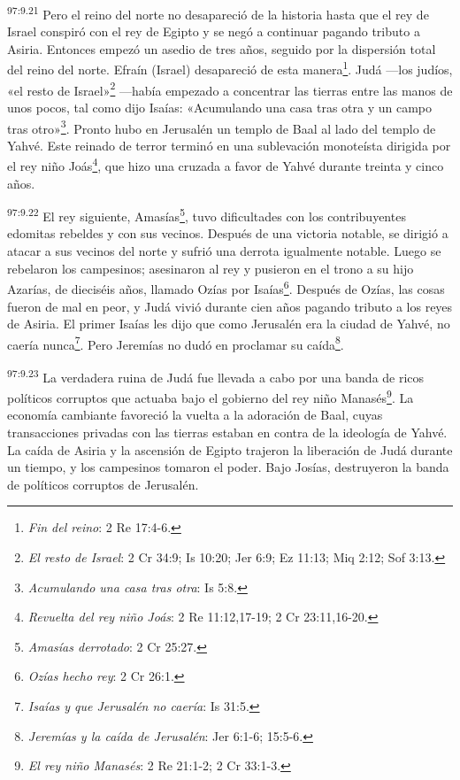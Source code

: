 \par
\textsuperscript{97:9.21} Pero el reino del norte no desapareció de la historia hasta que el rey de Israel conspiró con el rey de Egipto y se negó a continuar pagando tributo a Asiria. Entonces empezó un asedio de tres años, seguido por la dispersión total del reino del norte. Efraín (Israel) desapareció de esta manera\footnote{\textit{Fin del reino}: 2 Re 17:4-6.}. Judá ---los judíos, «el resto de Israel»\footnote{\textit{El resto de Israel}: 2 Cr 34:9; Is 10:20; Jer 6:9; Ez 11:13; Miq 2:12; Sof 3:13.} ---había empezado a concentrar las tierras entre las manos de unos pocos, tal como dijo Isaías: «Acumulando una casa tras otra y un campo tras otro»\footnote{\textit{Acumulando una casa tras otra}: Is 5:8.}. Pronto hubo en Jerusalén un templo de Baal al lado del templo de Yahvé. Este reinado de terror terminó en una sublevación monoteísta dirigida por el rey niño Joás\footnote{\textit{Revuelta del rey niño Joás}: 2 Re 11:12,17-19; 2 Cr 23:11,16-20.}, que hizo una cruzada a favor de Yahvé durante treinta y cinco años.

\par
\textsuperscript{97:9.22} El rey siguiente, Amasías\footnote{\textit{Amasías derrotado}: 2 Cr 25:27.}, tuvo dificultades con los contribuyentes edomitas rebeldes y con sus vecinos. Después de una victoria notable, se dirigió a atacar a sus vecinos del norte y sufrió una derrota igualmente notable. Luego se rebelaron los campesinos; asesinaron al rey y pusieron en el trono a su hijo Azarías, de dieciséis años, llamado Ozías por Isaías\footnote{\textit{Ozías hecho rey}: 2 Cr 26:1.}. Después de Ozías, las cosas fueron de mal en peor, y Judá vivió durante cien años pagando tributo a los reyes de Asiria. El primer Isaías les dijo que como Jerusalén era la ciudad de Yahvé, no caería nunca\footnote{\textit{Isaías y que Jerusalén no caería}: Is 31:5.}. Pero Jeremías no dudó en proclamar su caída\footnote{\textit{Jeremías y la caída de Jerusalén}: Jer 6:1-6; 15:5-6.}.

\par
\textsuperscript{97:9.23} La verdadera ruina de Judá fue llevada a cabo por una banda de ricos políticos corruptos que actuaba bajo el gobierno del rey niño Manasés\footnote{\textit{El rey niño Manasés}: 2 Re 21:1-2; 2 Cr 33:1-3.}. La economía cambiante favoreció la vuelta a la adoración de Baal, cuyas transacciones privadas con las tierras estaban en contra de la ideología de Yahvé. La caída de Asiria y la ascensión de Egipto trajeron la liberación de Judá durante un tiempo, y los campesinos tomaron el poder. Bajo Josías, destruyeron la banda de políticos corruptos de Jerusalén.

